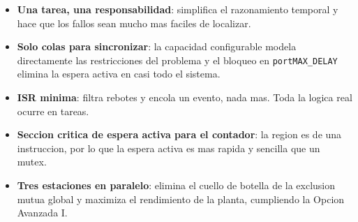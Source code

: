 \documentclass[12pt,a4paper]{article}
\begin{document}
\begin{itemize}
    \item \textbf{Una tarea, una responsabilidad}: simplifica el razonamiento temporal y hace que los fallos sean mucho mas faciles de localizar.
    \item \textbf{Solo colas para sincronizar}: la capacidad configurable modela directamente las restricciones del problema y el bloqueo en \texttt{portMAX\_DELAY} elimina la espera activa en casi todo el sistema.
    \item \textbf{ISR minima}: filtra rebotes y encola un evento, nada mas. Toda la logica real ocurre en tareas.
    \item \textbf{Seccion critica de espera activa para el contador}: la region es de una instruccion, por lo que la espera activa es mas rapida y sencilla que un mutex.
    \item \textbf{Tres estaciones en paralelo}: elimina el cuello de botella de la exclusion mutua global y maximiza el rendimiento de la planta, cumpliendo la Opcion Avanzada I.
\end{itemize}
\end{document}
